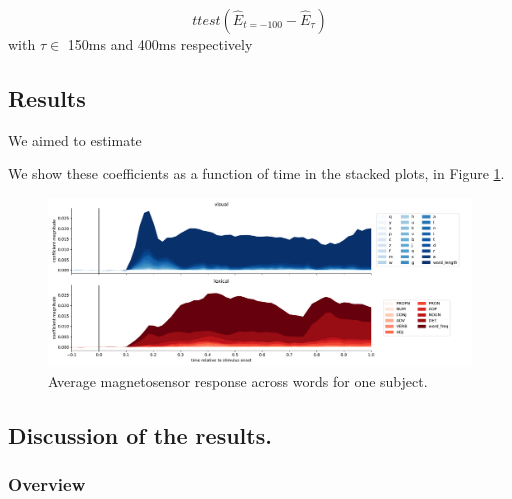 \begin{equation}
ttest(\hat E_{t=-100} - \hat E_{\tau})
\end{equation}
with $\tau \in $ 150ms and 400ms respectively


\subsection{Results}

We aimed to estimate

We show these coefficients as a function of time in the stacked plots, in Figure
\ref{fig:megresult}.

\begin{figure}
  \centering
  \includegraphics[width=\textwidth, trim=1.5cm 1cm 0.5cm 0cm,
clip=True]{meg_result.pdf}
  \caption{Average magnetosensor response across words for one subject.}
  \label{fig:megresult}
\end{figure}



\subsection{Discussion of the results.}

\subsubsection{Overview}
